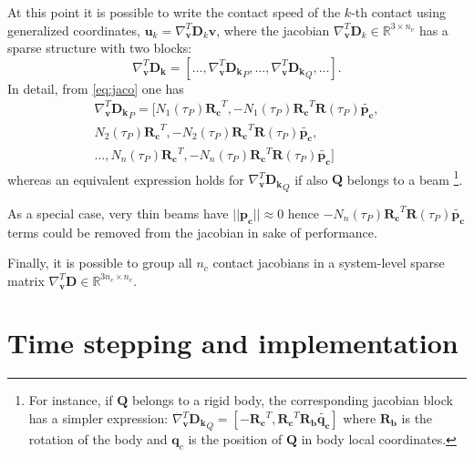\documentclass[review]{elsarticle}
\def\avect#1{{\boldsymbol{#1}}}
\def\amatr#1{{\boldsymbol{#1}}}
\begin{document}
At this point it is possible to write the contact speed of the $k$-th contact using generalized coordinates, 
$\avect{u}_k=\nabla_{\avect{v}}^T\amatr{D}_k \avect{v}$,
where the jacobian $\nabla_{\avect{v}}^T  \amatr{D}_k \in \mathbb{R}^{3 \times n_v}$ has a sparse structure with two blocks:
\begin{equation}
\nabla_{\avect{v}}^T\amatr{D_k} =
\left[\dots, \nabla_{\avect{v}}^T\amatr{D_k}_P, \dots, \nabla_{\avect{v}}^T\amatr{D_k}_Q, \dots \right].
\end{equation}
In detail, from \eqref{eq:jaco} one has
%
\begin{multline}
\nabla_{\avect{v}}^T\amatr{D_k}_P = 
 \Big[ 
  N_1(\tau_P) \amatr{R_c}^T,
  -N_1(\tau_P) \amatr{R_c}^T \amatr{R}(\tau_P) \amatr{\tilde{p_{c}}}, \\
  N_2(\tau_P) \amatr{R_c}^T, 
  -N_2(\tau_P) \amatr{R_c}^T \amatr{R}(\tau_P) \amatr{\tilde{p_{c}}}, \\
  \dots,
  N_n(\tau_P) \amatr{R_c}^T,
  -N_n(\tau_P) \amatr{R_c}^T \amatr{R}(\tau_P) \amatr{\tilde{p_{c}}}
 \Big]
 \label{eq:jacodetail}
\end{multline}
%
whereas an equivalent expression holds for $\nabla_{\avect{v}}^T\amatr{D_k}_Q$ if also $\avect{Q}$ belongs to a beam 
\footnote{For instance, if $\avect{Q}$ belongs to a rigid body, the corresponding jacobian block has a simpler expression: 
$\nabla_{\avect{v}}^T\amatr{D_k}_Q=
\left[ 
-\amatr{R_c}^T,  \amatr{R_c}^T \amatr{R_b} \amatr{\tilde{q_{c}}}
\right]$ where $\amatr{R_b}$ is the rotation of the body and $\avect{q}_{c}$ is the position of $\avect{Q}$ in body local coordinates.}.

As a special case, very thin beams have $||\avect{p_{c}}||\approx 0$ hence $-N_n(\tau_P) \amatr{R_c}^T \amatr{R}(\tau_P) \amatr{\tilde{p_{c}}}$ terms could be removed from the jacobian in sake of performance. 

Finally, it is possible to group all $n_c$ contact jacobians in a system-level sparse matrix $\nabla_\avect{v}^T \avect{D} \in \mathbb{R}^{3n_c \times n_v}$.


\section{Time stepping and implementation}
\end{document}
